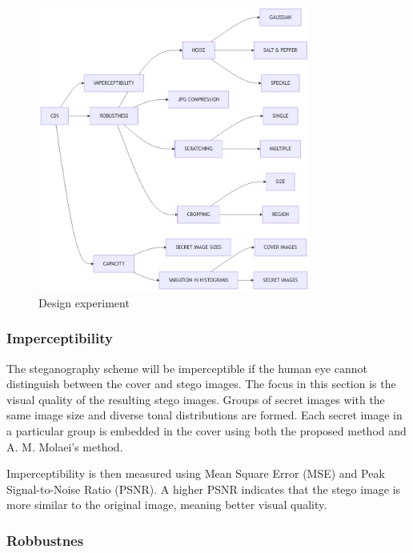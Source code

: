 \documentclass{ittelkom}
\begin{document}

\begin{figure}[!htb]
    \centering
    \includegraphics[width=0.8\textwidth]{gambar/experiment.png}
    \caption{Design experiment}
    \label{fig:experiment}
\end{figure}

\subsubsection{Imperceptibility}

The steganography scheme will be imperceptible if the human eye cannot
distinguish between the cover and stego images. The focus in this section is
the visual quality of the resulting stego images. Groups of secret images with
the same image size and diverse tonal distributions are formed. Each secret
image in a particular group is embedded in the cover using both the proposed
method and A. M. Molaei's method.

Imperceptibility is then measured using Mean Square Error (MSE) and Peak
Signal-to-Noise Ratio (PSNR). A higher PSNR indicates that the stego image is
more similar to the original image, meaning better visual quality.

\subsubsection{Robbustnes}
\end{document}
